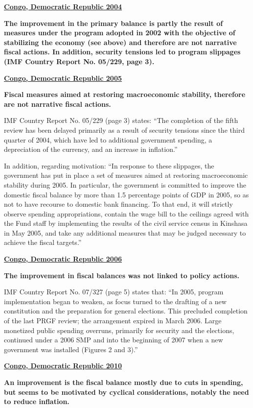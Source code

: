 \textbf{\underline{Congo, Democratic Republic 2004}}

\textbf{The improvement in the primary balance is partly the result of measures under the program adopted in 2002 with the objective of stabilizing the economy (see above) and therefore are not narrative fiscal actions. In addition, security tensions led to program slippages (IMF Country Report No. 05/229, page 3).}

\textbf{\underline{Congo, Democratic Republic 2005}}

\textbf{Fiscal measures aimed at restoring macroeconomic stability, therefore are not narrative fiscal actions.}

IMF Country Report No. 05/229 (page 3) states: “The completion of the fifth review has been delayed primarily as a result of security tensions since the third quarter of 2004, which have led to additional government spending, a depreciation of the currency, and an increase in inflation.” 

In addition, regarding motivation:  “In response to these slippages, the government has put in place a set of measures aimed at restoring macroeconomic stability during 2005. In particular, the government is committed to improve the domestic fiscal balance by more than 1.5 percentage points of GDP in 2005, so as not to have recourse to domestic bank financing. To that end, it will strictly observe spending appropriations, contain the wage bill to the ceilings agreed with the Fund staff by implementing the results of the civil service census in Kinshasa in May 2005, and take any additional measures that may be judged necessary to achieve the fiscal targets.”

\textbf{\underline{Congo, Democratic Republic 2006}}

\textbf{The improvement in fiscal balances was not linked to policy actions.}

IMF Country Report No. 07/327 (page 5) states that: “In 2005, program implementation began to weaken, as focus turned to the drafting of a new constitution and the preparation for general elections. This precluded completion of the last PRGF review; the arrangement expired in March 2006. Large monetized public spending overruns, primarily for security and the elections, continued under a 2006 SMP and into the beginning of 2007 when a new government was installed (Figures 2 and 3).”

\textbf{\underline{Congo, Democratic Republic 2010}}

\textbf{An improvement is the fiscal balance mostly due to cuts in spending, but seems to be motivated by cyclical considerations, notably the need to reduce inflation.}

